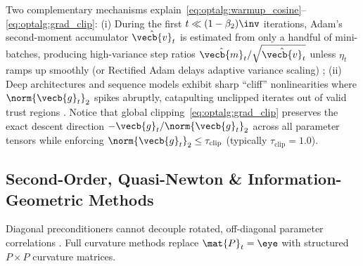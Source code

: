 \documentclass[../../../../master.tex]{subfiles}
\begin{document}
\begin{intuition}
Two complementary mechanisms explain~\eqref{eq:optalg:warmup_cosine}--\eqref{eq:optalg:grad_clip}: (i) During the first $t \ll (1-\beta_2)\inv$ iterations, Adam's second-moment accumulator $\hat{\vecb{v}}_t$ is estimated from only a handful of mini-batches, producing high-variance step ratios $\hat{\vecb{m}}_t/\sqrt{\hat{\vecb{v}}_t}$ unless $\eta_t$ ramps up smoothly (or Rectified Adam delays adaptive variance scaling)  ; (ii) Deep architectures and sequence models exhibit sharp ``cliff'' nonlinearities where $\norm{\vecb{g}_t}_2$ spikes abruptly, catapulting unclipped iterates out of valid trust regions  . Notice that global clipping~\eqref{eq:optalg:grad_clip} preserves the exact descent direction $-\vecb{g}_t/\norm{\vecb{g}_t}_2$ across all parameter tensors while enforcing $\norm{\vecb{g}_t}_2 \le \tau_{\mathrm{clip}}$ (typically $\tau_{\mathrm{clip}} = 1.0$).
\end{intuition}

\subsection{Second-Order, Quasi-Newton \& Information-Geometric Methods}
\label{subsec:optalg:secondorder}

Diagonal preconditioners cannot decouple rotated, off-diagonal parameter correlations . Full curvature methods replace $\mat{P}_t = \eye$ with structured $P \times P$ curvature matrices.
\end{document}
